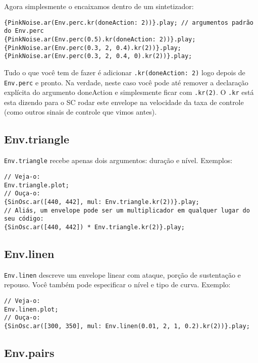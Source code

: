 Agora simplesmente o encaixamos dentro de um sintetizador:

\begin{lstlisting}[style=SuperCollider-IDE, basicstyle=\scttfamily\footnotesize]
{PinkNoise.ar(Env.perc.kr(doneAction: 2))}.play; // argumentos padrão do Env.perc
{PinkNoise.ar(Env.perc(0.5).kr(doneAction: 2))}.play; 
{PinkNoise.ar(Env.perc(0.3, 2, 0.4).kr(2))}.play;
{PinkNoise.ar(Env.perc(0.3, 2, 0.4, 0).kr(2))}.play;
\end{lstlisting}
 
Tudo o que você tem de fazer é adicionar \texttt{.kr(doneAction: 2)} logo depois de \texttt{Env.perc} e pronto. Na verdade, neste caso você pode até remover a declaração explícita do argumento doneAction e simplesmente ficar com \texttt{.kr(2)}. O \texttt{.kr} está esta dizendo para o SC rodar este envelope na velocidade da taxa de controle (como outros sinais de controle que vimos antes).

\subsection{Env.triangle}

\texttt{Env.triangle} recebe apenas dois argumentos: duração e nível. Exemplos:

 
\begin{lstlisting}[style=SuperCollider-IDE, basicstyle=\scttfamily\footnotesize]
// Veja-o:
Env.triangle.plot;
// Ouça-o:
{SinOsc.ar([440, 442], mul: Env.triangle.kr(2))}.play;
// Aliás, um envelope pode ser um multiplicador em qualquer lugar do seu código:
{SinOsc.ar([440, 442]) * Env.triangle.kr(2)}.play;
\end{lstlisting}

\subsection{Env.linen}

\texttt{Env.linen} descreve um envelope linear com ataque, porção de sustentação e repouso. Você também pode especificar o nível e tipo de curva. Exemplo:

\begin{lstlisting}[style=SuperCollider-IDE, basicstyle=\scttfamily\footnotesize]
// Veja-o:
Env.linen.plot;
// Ouça-o:
{SinOsc.ar([300, 350], mul: Env.linen(0.01, 2, 1, 0.2).kr(2))}.play;
\end{lstlisting}

\subsection{Env.pairs}

